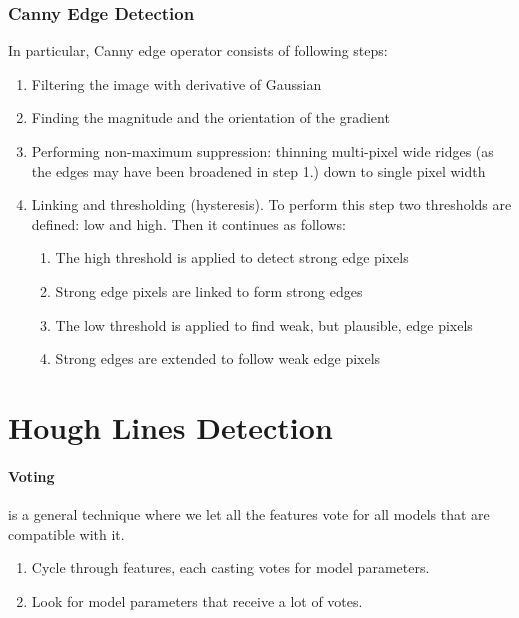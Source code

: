 \subsubsection{Canny Edge Detection}
In particular, Canny edge operator consists of following steps\cite{canny-edge}:
\begin{enumerate}
	\item Filtering the image with derivative of Gaussian
	\item Finding the magnitude and the orientation of the gradient
	\item Performing non-maximum suppression: thinning multi-pixel wide ridges (as the edges may have been broadened in step 1.) down to single pixel width
	\item Linking and thresholding (hysteresis). To perform this step two thresholds are defined: low and high. Then it continues as follows:
	\begin{enumerate}
		\item The high threshold is applied to detect strong edge pixels
		\item Strong edge pixels are linked to form strong edges
		\item The low threshold is applied to find weak, but plausible, edge pixels
		\item Strong edges are extended to follow weak edge pixels
	\end{enumerate}
\end{enumerate}

\section{Hough Lines Detection}
\paragraph{Voting}
is a general technique where we let all the features vote for all models that are compatible with it.
\begin{enumerate}
	\item Cycle through features, each casting votes for model parameters.
	\item Look for model parameters that receive a lot of votes.
\end{enumerate}


